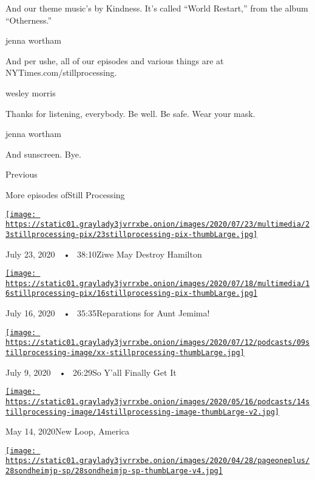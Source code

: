And our theme music's by Kindness. It's called ``World Restart,'' from
the album ``Otherness.''

jenna wortham

And per ushe, all of our episodes and various things are at
NYTimes.com/stillprocessing.

wesley morris

Thanks for listening, everybody. Be well. Be safe. Wear your mask.

jenna wortham

And sunscreen. Bye.

Previous

More episodes ofStill Processing

\href{https://www.nytimes3xbfgragh.onion/2020/07/23/podcasts/hamilton-ziwe-discomfort.html?action=click\&module=audio-series-bar\&region=header\&pgtype=Article}{\texttt{[image: https://static01.graylady3jvrrxbe.onion/images/2020/07/23/multimedia/23stillprocessing-pix/23stillprocessing-pix-thumbLarge.jpg]}}

July 23, 2020~~•~ 38:10Ziwe May Destroy Hamilton

\href{https://www.nytimes3xbfgragh.onion/2020/07/16/podcasts/reparations-for-aunt-jemima.html?action=click\&module=audio-series-bar\&region=header\&pgtype=Article}{\texttt{[image: https://static01.graylady3jvrrxbe.onion/images/2020/07/18/multimedia/16stillprocessing-pix/16stillprocessing-pix-thumbLarge.jpg]}}

July 16, 2020~~•~ 35:35Reparations for Aunt Jemima!

\href{https://www.nytimes3xbfgragh.onion/2020/07/09/podcasts/still-processing-black-lives-matter.html?action=click\&module=audio-series-bar\&region=header\&pgtype=Article}{\texttt{[image: https://static01.graylady3jvrrxbe.onion/images/2020/07/12/podcasts/09stillprocessing-image/xx-stillprocessing-thumbLarge.jpg]}}

July 9, 2020~~•~ 26:29So Y'all Finally Get It

\href{https://www.nytimes3xbfgragh.onion/2020/05/14/podcasts/still-processing-westworld-hollywood-utopia-dystopia.html?action=click\&module=audio-series-bar\&region=header\&pgtype=Article}{\texttt{[image: https://static01.graylady3jvrrxbe.onion/images/2020/05/16/podcasts/14stillprocessing-image/14stillprocessing-image-thumbLarge-v2.jpg]}}

May 14, 2020New Loop, America

\href{https://www.nytimes3xbfgragh.onion/2020/05/07/podcasts/still-processing-internet-vulnerability-sondheim-parks-recreation.html?action=click\&module=audio-series-bar\&region=header\&pgtype=Article}{\texttt{[image: https://static01.graylady3jvrrxbe.onion/images/2020/04/28/pageoneplus/28sondheimjp-sp/28sondheimjp-sp-thumbLarge-v4.jpg]}}

